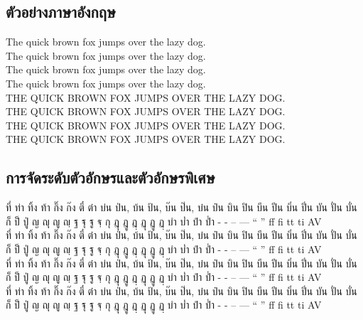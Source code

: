 \documentclass[twocolumn,a4paper]{article}
\begin{document}
\subsection{ตัวอย่างภาษาอังกฤษ}
The quick brown fox jumps over the lazy dog.\\
The quick brown fox jumps over the lazy dog.\\
The quick brown fox jumps over the lazy dog.\\
The quick brown fox jumps over the lazy dog.\\
\MakeUppercase{The quick brown fox jumps over the lazy dog.}\\
\MakeUppercase{The quick brown fox jumps over the lazy dog.}\\
\MakeUppercase{The quick brown fox jumps over the lazy dog.}\\
\MakeUppercase{The quick brown fox jumps over the lazy dog.}\\



\subsection{การจัดระดับตัวอักษรและตัวอักษรพิเศษ}
\noindent
{}
ที่ ท่า ทิ้ง ท้า กิ๊ง ก๊ง ตี๋ ต๋า บ่น ป่น, บ้น ป้น, บ๊น ป๊น, บ๋น ป๋น บิน ปิน บีน ปีน บิ่น ปิ่น บัน ปั่น บั่น ก็ ป็ ปู่ ญ ญุ ญู ญฺ ฐ ฐุ ฐู ฐฺ กุ ฎุ ฎู ฎฺ ฏุ ฏู ฏฺ บำ บ่ำ ปำ ป่ำ -\textyamakkan{} \textfongmun{} \textangkhankhu{} \textkhomut{} - -- --- `` '' ff fi tt ti AV\\
ที่ ท่า ทิ้ง ท้า กิ๊ง ก๊ง ตี๋ ต๋า บ่น ป่น, บ้น ป้น, บ๊น ป๊น, บ๋น ป๋น บิน ปิน บีน ปีน บิ่น ปิ่น บัน ปั่น บั่น ก็ ป็ ปู่ ญ ญุ ญู ญฺ ฐ ฐุ ฐู ฐฺ กุ ฎุ ฎู ฎฺ ฏุ ฏู ฏฺ บำ บ่ำ ปำ ป่ำ -\textyamakkan{} \textfongmun{} \textangkhankhu{} \textkhomut{} - -- --- `` '' ff fi tt ti AV\\
ที่ ท่า ทิ้ง ท้า กิ๊ง ก๊ง ตี๋ ต๋า บ่น ป่น, บ้น ป้น, บ๊น ป๊น, บ๋น ป๋น บิน ปิน บีน ปีน บิ่น ปิ่น บัน ปั่น บั่น ก็ ป็ ปู่ ญ ญุ ญู ญฺ ฐ ฐุ ฐู ฐฺ กุ ฎุ ฎู ฎฺ ฏุ ฏู ฏฺ บำ บ่ำ ปำ ป่ำ -\textyamakkan{} \textfongmun{} \textangkhankhu{} \textkhomut{} - -- --- `` '' ff fi tt ti AV\\
ที่ ท่า ทิ้ง ท้า กิ๊ง ก๊ง ตี๋ ต๋า บ่น ป่น, บ้น ป้น, บ๊น ป๊น, บ๋น ป๋น บิน ปิน บีน ปีน บิ่น ปิ่น บัน ปั่น บั่น ก็ ป็ ปู่ ญ ญุ ญู ญฺ ฐ ฐุ ฐู ฐฺ กุ ฎุ ฎู ฎฺ ฏุ ฏู ฏฺ บำ บ่ำ ปำ ป่ำ -\textyamakkan{} \textfongmun{} \textangkhankhu{} \textkhomut{} - -- --- `` '' ff fi tt ti AV\\
\end{document}
